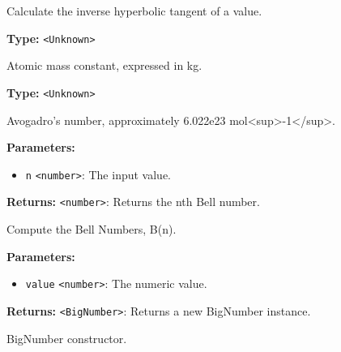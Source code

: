 \documentclass[12pt,a4paper]{article}
\begin{document}
\noindent Calculate the inverse hyperbolic tangent of a value.

\vspace{5mm}
\noindent {}\vspace{4mm}


\noindent \textbf{Type:} \texttt{<Unknown>}

\noindent Atomic mass constant, expressed in kg.

\vspace{5mm}
\noindent {}\vspace{4mm}


\noindent \textbf{Type:} \texttt{<Unknown>}

\noindent Avogadro's number, approximately \textasciigrave{}6.022e23\textasciigrave{} mol<sup>-1</sup>.

\vspace{5mm}
\noindent {}


\noindent \textbf{Parameters:}
\begin{itemize}
  \item \texttt{n} \texttt{<number>}: The input value.
\end{itemize}

\noindent \textbf{Returns:} \texttt{<number>}: Returns the nth Bell number.

\noindent Compute the Bell Numbers, \textasciigrave{}B(n)\textasciigrave{}.

\vspace{5mm}
\noindent {}


\noindent \textbf{Parameters:}
\begin{itemize}
  \item \texttt{value} \texttt{<number>}: The numeric value.
\end{itemize}

\noindent \textbf{Returns:} \texttt{<BigNumber>}: Returns a new BigNumber instance.

\noindent BigNumber constructor.

\vspace{5mm}
\noindent {}
\end{document}
